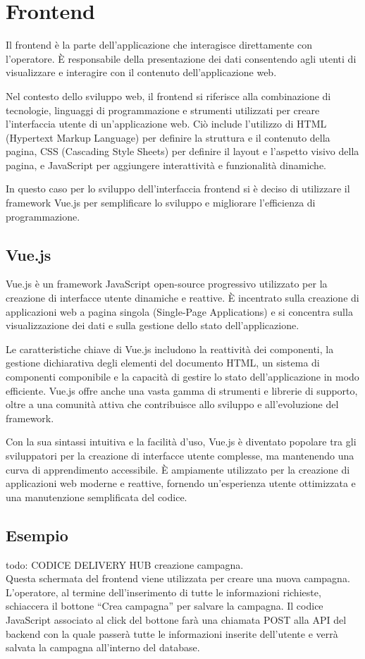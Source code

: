 \section{Frontend}
Il frontend è la parte dell’applicazione che interagisce direttamente con 
l’operatore. È responsabile della presentazione dei dati consentendo agli 
utenti di visualizzare e interagire con il contenuto dell'applicazione web.

Nel contesto dello sviluppo web, il frontend si riferisce alla combinazione 
di tecnologie, linguaggi di programmazione e strumenti utilizzati per creare 
l'interfaccia utente di un'applicazione web. Ciò include l'utilizzo di HTML 
(Hypertext Markup Language) per definire la struttura e il contenuto della 
pagina, CSS (Cascading Style Sheets) per definire il layout e l'aspetto 
visivo della pagina, e JavaScript per aggiungere interattività e funzionalità 
dinamiche.

In questo caso per lo sviluppo dell’interfaccia frontend si è deciso di 
utilizzare il framework Vue.js per semplificare lo sviluppo e migliorare 
l'efficienza di programmazione.

\subsection{Vue.js}
Vue.js è un framework JavaScript open-source progressivo utilizzato per la creazione di 
interfacce utente dinamiche e reattive. È incentrato sulla creazione di 
applicazioni web a pagina singola (Single-Page Applications) e si concentra 
sulla visualizzazione dei dati e sulla gestione dello stato dell'applicazione.

Le caratteristiche chiave di Vue.js includono la reattività dei componenti, 
la gestione dichiarativa degli elementi del documento HTML, un sistema di 
componenti componibile e la capacità di gestire lo stato dell'applicazione in 
modo efficiente. Vue.js offre anche una vasta gamma di strumenti e librerie di 
supporto, oltre a una comunità attiva che contribuisce allo sviluppo e 
all'evoluzione del framework.

Con la sua sintassi intuitiva e la facilità d'uso, Vue.js è diventato popolare 
tra gli sviluppatori per la creazione di interfacce utente complesse, ma 
mantenendo una curva di apprendimento accessibile. È ampiamente utilizzato per 
la creazione di applicazioni web moderne e reattive, fornendo un'esperienza 
utente ottimizzata e una manutenzione semplificata del codice. 
~\cite{wiki:vuejs}\\


\subsection{Esempio}
todo: CODICE DELIVERY HUB creazione campagna.\\

Questa schermata del frontend viene utilizzata per creare una nuova campagna.
L’operatore, al termine dell’inserimento di tutte le informazioni richieste, 
schiaccera il bottone “Crea campagna” per salvare la campagna.
Il codice JavaScript associato al click del bottone farà una chiamata POST 
alla API del backend con la quale passerà tutte le informazioni inserite 
dell’utente e verrà salvata la campagna all’interno del database.
